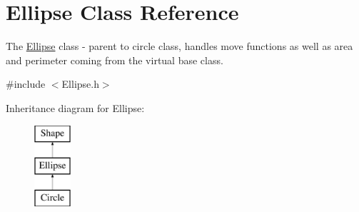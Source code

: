 \hypertarget{class_ellipse}{}\section{Ellipse Class Reference}
\label{class_ellipse}


The \hyperlink{class_ellipse}{Ellipse} class -\/ parent to circle class, handles move functions as well as area and perimeter coming from the virtual base class.  




{\ttfamily \#include $<$Ellipse.\+h$>$}

Inheritance diagram for Ellipse\+:\begin{figure}[H]
\begin{center}
\leavevmode
\includegraphics[height=3.000000cm]{class_ellipse}
\end{center}
\end{figure}

